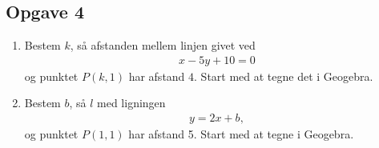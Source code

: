 \subsection*{Opgave 4}
\begin{enumerate}[label=\roman*)]
\item Bestem $k$, så afstanden mellem linjen givet ved 
\begin{align*}
x-5y+10 = 0
\end{align*}
og punktet $P(k,1)$ har afstand $4$. Start med at tegne det i Geogebra.
\item Bestem $b$, så $l$ med ligningen
\begin{align*}
y = 2x+b,
\end{align*}
 og punktet $P(1,1)$ har afstand 5. Start med at tegne i Geogebra.
\end{enumerate}

